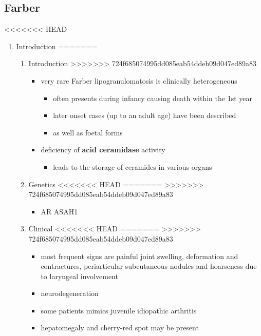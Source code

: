 \documentclass[fontsize=12pt]{scrartcl}
\begin{document}
\begin{enumerate}
\begin{enumerate}
\begin{enumerate}
\begin{enumerate}
\begin{table}[htbp]
\begin{enumerate}
\subsection{Farber}
<<<<<<< HEAD
\label{sec:org32c2a85}
\begin{enumerate}
\item Introduction
\label{sec:org8a40ae3}
=======
\label{sec:org5aee940}
\begin{enumerate}
\item Introduction
\label{sec:orgd151110}
>>>>>>> 724f685074995dd085eab54ddeb09d047ed89a83
\begin{itemize}
\item very rare Farber lipogranulomatosis is clinically heterogeneous
\begin{itemize}
\item often presents during infancy causing death within the 1st year
\item later onset cases (up to an adult age) have been described
\item as well as foetal forms
\end{itemize}
\item deficiency of \textbf{acid ceramidase} activity
\begin{itemize}
\item leads to the storage of ceramides in various organs
\end{itemize}
\end{itemize}
\item Genetics
<<<<<<< HEAD
\label{sec:org96e1e08}
=======
\label{sec:org2eb3352}
>>>>>>> 724f685074995dd085eab54ddeb09d047ed89a83
\begin{itemize}
\item AR ASAH1
\end{itemize}
\item Clinical
<<<<<<< HEAD
\label{sec:org12b8b33}
=======
\label{sec:org1d22819}
>>>>>>> 724f685074995dd085eab54ddeb09d047ed89a83
\begin{itemize}
\item most frequent signs are painful joint swelling, deformation and
contractures, periarticular subcutaneous nodules and hoarseness due
to laryngeal involvement
\item neurodegeneration
\item some patients mimics juvenile idiopathic arthritis
\item hepatomegaly and cherry-red spot may be present
\end{itemize}


\end{enumerate}
\end{enumerate}
\end{enumerate}
\end{table}
\end{enumerate}
\end{enumerate}
\end{enumerate}
\end{enumerate}
\end{document}
